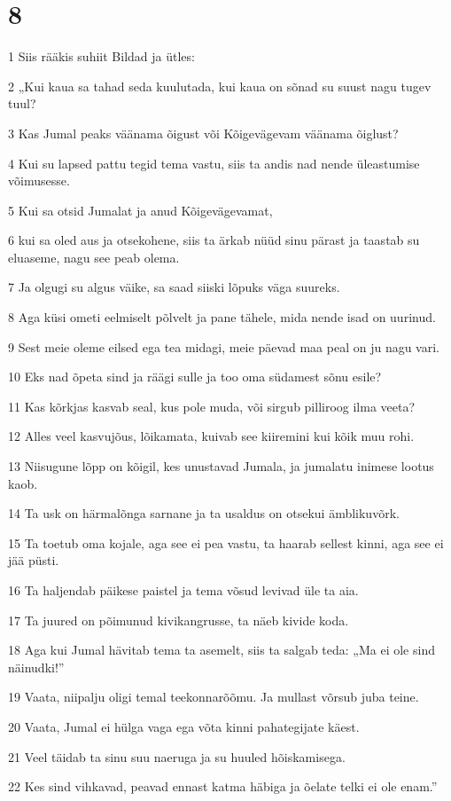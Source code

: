 \chapter{8}

\par 1 Siis rääkis suhiit Bildad ja ütles:
\par 2 „Kui kaua sa tahad seda kuulutada, kui kaua on sõnad su suust nagu tugev tuul?
\par 3 Kas Jumal peaks väänama õigust või Kõigevägevam väänama õiglust?
\par 4 Kui su lapsed pattu tegid tema vastu, siis ta andis nad nende üleastumise võimusesse.
\par 5 Kui sa otsid Jumalat ja anud Kõigevägevamat,
\par 6 kui sa oled aus ja otsekohene, siis ta ärkab nüüd sinu pärast ja taastab su eluaseme, nagu see peab olema.
\par 7 Ja olgugi su algus väike, sa saad siiski lõpuks väga suureks.
\par 8 Aga küsi ometi eelmiselt põlvelt ja pane tähele, mida nende isad on uurinud.
\par 9 Sest meie oleme eilsed ega tea midagi, meie päevad maa peal on ju nagu vari.
\par 10 Eks nad õpeta sind ja räägi sulle ja too oma südamest sõnu esile?
\par 11 Kas kõrkjas kasvab seal, kus pole muda, või sirgub pilliroog ilma veeta?
\par 12 Alles veel kasvujõus, lõikamata, kuivab see kiiremini kui kõik muu rohi.
\par 13 Niisugune lõpp on kõigil, kes unustavad Jumala, ja jumalatu inimese lootus kaob.
\par 14 Ta usk on härmalõnga sarnane ja ta usaldus on otsekui ämblikuvõrk.
\par 15 Ta toetub oma kojale, aga see ei pea vastu, ta haarab sellest kinni, aga see ei jää püsti.
\par 16 Ta haljendab päikese paistel ja tema võsud levivad üle ta aia.
\par 17 Ta juured on põimunud kivikangrusse, ta näeb kivide koda.
\par 18 Aga kui Jumal hävitab tema ta asemelt, siis ta salgab teda: „Ma ei ole sind näinudki!”
\par 19 Vaata, niipalju oligi temal teekonnarõõmu. Ja mullast võrsub juba teine.
\par 20 Vaata, Jumal ei hülga vaga ega võta kinni pahategijate käest.
\par 21 Veel täidab ta sinu suu naeruga ja su huuled hõiskamisega.
\par 22 Kes sind vihkavad, peavad ennast katma häbiga ja õelate telki ei ole enam.”

